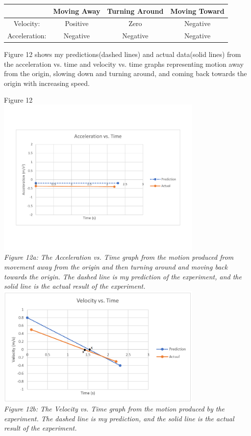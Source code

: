 \documentclass[aps,letterpaper,11pt]{revtex4}
\begin{document}
\begin{center}
\begin{tabular}{|c|c|c|c|}
\hline
  & Moving Away & Turning Around & Moving Toward\\
\hline
Velocity: & Positive & Zero & Negative\\
\hline  
Acceleration: & Negative & Negative & Negative\\
\hline
\end{tabular}
\end{center} 

\newpage

Figure 12 shows my predictions(dashed lines) and actual data(solid lines) from the acceleration vs. time and velocity vs. time graphs representing motion away from the origin, slowing down and turning around, and coming back towards the origin with increasing speed. 

\begin{center}
Figure 12\\
\vspace{-10mm}
\includegraphics[width=4in]{PartEAcceleration.pdf}\\
\vspace{-10mm}
\textit{Figure 12a: The Acceleration vs. Time graph from the motion produced from movement away from the origin and then turning around and moving back towards the origin. The dashed line is my prediction of the experiment, and the solid line is the actual result of the experiment.}\\
\vspace{10mm}
\includegraphics[width=4in]{PartEVelocity.png}\\
\textit{Figure 12b: The Velocity vs. Time graph from the motion produced by the experiment. The dashed line is my prediction, and the solid line is the actual result of the experiment.}
\end{center}
\end{document}
